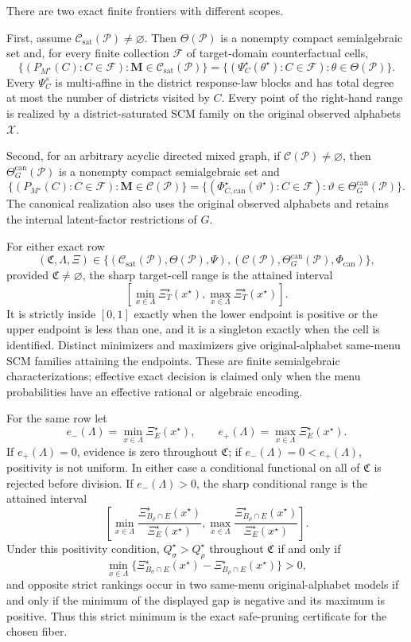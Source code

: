 There are two exact finite frontiers with different scopes.

First, assume \(\mathcal C_{\mathrm{sat}}(\mathcal P)\ne\varnothing\).  Then \(\Theta(\mathcal P)\) is a nonempty compact semialgebraic set and, for every finite collection \(\mathcal F\) of target-domain counterfactual cells,
\[
\{(P_{M^\star}(C):C\in\mathcal F):\mathbf M\in\mathcal C_{\mathrm{sat}}(\mathcal P)\}
=
\{(\Psi_C^\star(\theta^\star):C\in\mathcal F):\theta\in\Theta(\mathcal P)\}.
\]
Every \(\Psi_C^s\) is multi-affine in the district response-law blocks and has total degree at most the number of districts visited by \(C\).  Every point of the right-hand range is realized by a district-saturated SCM family on the original observed alphabets \(\mathcal X\).

Second, for an arbitrary acyclic directed mixed graph, if \(\mathcal C(\mathcal P)\ne\varnothing\), then \(\Theta_G^{\mathrm{can}}(\mathcal P)\) is a nonempty compact semialgebraic set and
\[
\{(P_{M^\star}(C):C\in\mathcal F):\mathbf M\in\mathcal C(\mathcal P)\}
=
\{(\Phi_{C,\mathrm{can}}^\star(\vartheta^\star):C\in\mathcal F):
\vartheta\in\Theta_G^{\mathrm{can}}(\mathcal P)\}.
\]
The canonical realization also uses the original observed alphabets and retains the internal latent-factor restrictions of \(G\).

For either exact row
\[
(\mathfrak C,\Lambda,\Xi)
\in
\{(\mathcal C_{\mathrm{sat}}(\mathcal P),\Theta(\mathcal P),\Psi),
(\mathcal C(\mathcal P),\Theta_G^{\mathrm{can}}(\mathcal P),\Phi_{\mathrm{can}})\},
\]
provided \(\mathfrak C\ne\varnothing\), the sharp target-cell range is the attained interval
\[
\left[
\min_{x\in\Lambda}\Xi_T^\star(x^\star),
\max_{x\in\Lambda}\Xi_T^\star(x^\star)
\right].
\]
It is strictly inside \([0,1]\) exactly when the lower endpoint is positive or the upper endpoint is less than one, and it is a singleton exactly when the cell is identified.  Distinct minimizers and maximizers give original-alphabet same-menu SCM families attaining the endpoints.  These are finite semialgebraic characterizations; effective exact decision is claimed only when the menu probabilities have an effective rational or algebraic encoding.

For the same row let
\[
e_-(\Lambda)=\min_{x\in\Lambda}\Xi_E^\star(x^\star),
\qquad
e_+(\Lambda)=\max_{x\in\Lambda}\Xi_E^\star(x^\star).
\]
If \(e_+(\Lambda)=0\), evidence is zero throughout \(\mathfrak C\); if \(e_-(\Lambda)=0<e_+(\Lambda)\), positivity is not uniform.  In either case a conditional functional on all of \(\mathfrak C\) is rejected before division.  If \(e_-(\Lambda)>0\), the sharp conditional range is the attained interval
\[
\left[
\min_{x\in\Lambda}
\frac{\Xi_{B_\rho\cap E}^\star(x^\star)}{\Xi_E^\star(x^\star)},
\max_{x\in\Lambda}
\frac{\Xi_{B_\rho\cap E}^\star(x^\star)}{\Xi_E^\star(x^\star)}
\right].
\]
Under this positivity condition, \(Q_\sigma^\star>Q_\rho^\star\) throughout \(\mathfrak C\) if and only if
\[
\min_{x\in\Lambda}
\{\Xi_{B_\sigma\cap E}^\star(x^\star)-\Xi_{B_\rho\cap E}^\star(x^\star)\}>0,
\]
and opposite strict rankings occur in two same-menu original-alphabet models if and only if the minimum of the displayed gap is negative and its maximum is positive.  Thus this strict minimum is the exact safe-pruning certificate for the chosen fiber.

